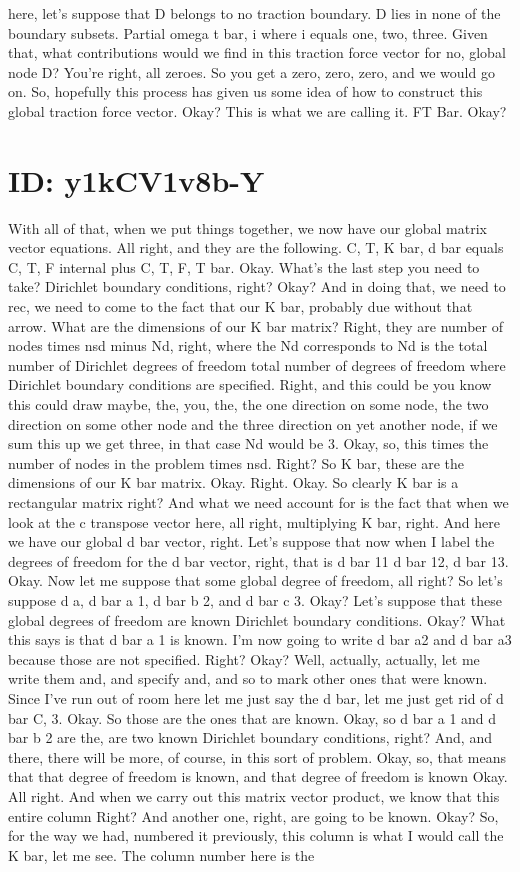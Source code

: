 \documentclass[10pt]{article}
\begin{document}
here, let's suppose that D belongs to no traction boundary. D lies in none of the boundary subsets. Partial omega t bar, i where i equals one, two, three. Given that, what contributions would we find in this traction force vector for no, global node D? You're right, all zeroes. So you get a zero, zero, zero, and we would go on. So, hopefully this process has given us some idea of how to construct this global traction force vector. Okay? This is what we are calling it. FT Bar. Okay?

\section*{ID: y1kCV1v8b-Y}
With all of that, when we put things together, we now have our global matrix vector equations. All right, and they are the following. C, T, K bar, d bar equals C, T, F internal plus C, T, F, T bar. Okay. What's the last step you need to take? Dirichlet boundary conditions, right? Okay? And in doing that, we need to rec, we need to come to the fact that our K bar, probably due without that arrow. What are the dimensions of our K bar matrix? Right, they are number of nodes times nsd minus Nd, right, where the Nd corresponds to Nd is the total number of Dirichlet degrees of freedom total number of degrees of freedom where Dirichlet boundary conditions are specified. Right, and this could be you know this could draw maybe, the, you, the, the one direction on some node, the two direction on some other node and the three direction on yet another node, if we sum this up we get three, in that case Nd would be 3. Okay, so, this times the number of nodes in the problem times nsd. Right? So K bar, these are the dimensions of our K bar matrix. Okay. Right. Okay. So clearly K bar is a rectangular matrix right? And what we need account for is the fact that when we look at the c transpose vector here, all right, multiplying K bar, right. And here we have our global d bar vector, right. Let's suppose that now when I label the degrees of freedom for the d bar vector, right, that is d bar 11 d bar 12, d bar 13. Okay. Now let me suppose that some global degree of freedom, all right? So let's suppose d a, d bar a 1, d bar b 2, and d bar c 3. Okay? Let's suppose that these global degrees of freedom are known Dirichlet boundary conditions. Okay? What this says is that d bar a 1 is known. I'm now going to write d bar a2 and d bar a3 because those are not specified. Right? Okay? Well, actually, actually, let me write them and, and specify and, and so to mark other ones that were known. Since I've run out of room here  let me just say the d bar, let me just get rid of d bar C, 3. Okay. So those are the ones that are known. Okay, so d bar a 1 and d bar b 2 are the, are two known Dirichlet boundary conditions, right? And, and there, there will be more, of course, in this sort of problem. Okay, so, that means that that degree of freedom is known, and that degree of freedom is known Okay. All right. And when we carry out this matrix vector product, we know that this entire column Right? And another one, right, are going to be known. Okay? So, for the way we had, numbered it previously, this column is what I would call the K bar, let me see. The column number here is the 
\end{document}
